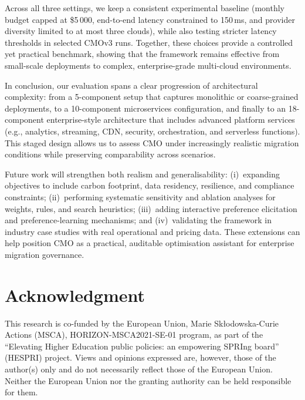 \documentclass[journal]{IEEEtran}
\newcommand{\cmo}{CMO\xspace}
\newcommand{\cmothree}{CMOv3\xspace}
\begin{document}
Across all three settings, we keep a consistent experimental
baseline (monthly budget capped at \$5\,000, end-to-end latency constrained to
150\,ms, and provider diversity limited to at most three clouds), while also
testing stricter latency thresholds in selected \cmothree runs. Together, these
choices provide a controlled yet practical benchmark, showing that the framework
remains effective from small-scale deployments to complex, enterprise-grade
multi-cloud environments.

In conclusion, our evaluation spans a clear progression of architectural
complexity: from a 5-component setup that captures monolithic or
coarse-grained deployments, to a 10-component microservices configuration, and
finally to an 18-component enterprise-style architecture that includes advanced
platform services (e.g., analytics, streaming, CDN, security, orchestration, and
serverless functions). This staged design allows us to assess \cmo under
increasingly realistic migration conditions while preserving comparability across
scenarios.

Future work will strengthen both realism and generalisability: (i)~expanding
objectives to include carbon footprint, data residency, resilience, and
compliance constraints; (ii)~performing systematic sensitivity and ablation
analyses for weights, rules, and search heuristics; (iii)~adding interactive
preference elicitation and preference-learning mechanisms; and
(iv)~validating the framework in industry case studies with real operational and
pricing data. These extensions can help position \cmo as a practical, auditable
optimisation assistant for enterprise migration governance.

\section*{Acknowledgment}
This research is co-funded by the European Union, Marie Sk\l{}odowska-Curie
Actions (MSCA), HORIZON-MSCA2021-SE-01 program, as part of the ``Elevating
Higher Education public policies: an empowering SPRIng board'' (HESPRI)
project. Views and opinions expressed are, however, those of the author(s)
only and do not necessarily reflect those of the European Union. Neither the
European Union nor the granting authority can be held responsible for them.
\end{document}
